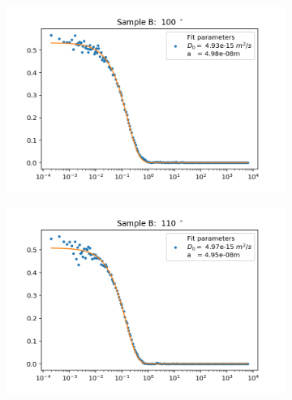 \documentclass[]{article}
\begin{document}
\begin{figure}[!h]
\medskip
\begin{subfigure}{0.48\textwidth}
\includegraphics[width=\linewidth]{Plots/B/100.png}
\end{subfigure}
\begin{subfigure}[c]{0.48\linewidth}
\includegraphics[width=\linewidth]{Plots/B/110.png}
\end{subfigure}


\end{figure}
\end{document}
